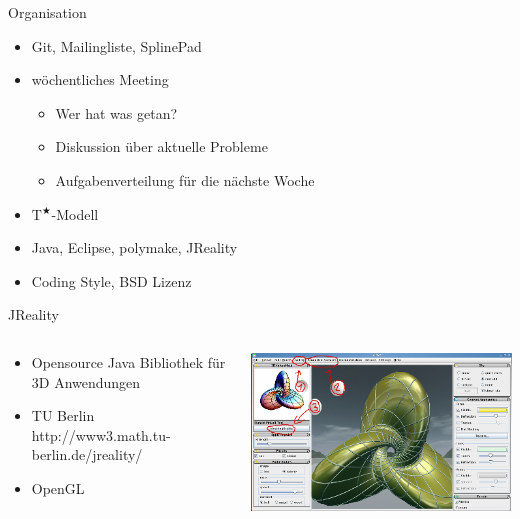 \documentclass[ucs,11pt]{beamer}
\begin{document}
\begin{frame}{Organisation}
		\begin{itemize}
			\item Git, Mailingliste, SplinePad \pause
			\item wöchentliches Meeting \pause
				\begin{itemize}
					\item Wer hat was getan?
					\item Diskussion über aktuelle Probleme
					\item Aufgabenverteilung für die nächste Woche
				\end{itemize} \pause
			\item T$^\bigstar$-Modell \pause
			\item Java, Eclipse, polymake, JReality \pause
			\item Coding Style, BSD Lizenz
		\end{itemize}
\end{frame}

\begin{frame}{JReality}

\begin{columns}
	\begin{column}{.48\textwidth}
		\begin{itemize}
			\item Opensource Java Bibliothek für 3D Anwendungen
			\item TU Berlin http://www3.math.tu-berlin.de/jreality/
			\item OpenGL
		\end{itemize}
	\end{column}%
	\hfill%
	\begin{column}{.48\textwidth}
\includegraphics[width=1\textwidth]{jRealityBla.png}
	\end{column}%
\end{columns}
\end{frame}
\end{document}
